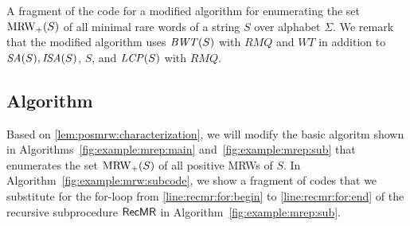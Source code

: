 \begin{algorithm}[t]
  \caption{A fragment of the code for a modified algorithm for enumerating the set $\mathrm{MRW}_+(S)$ of all minimal rare words of a string $S$ over alphabet $\Sigma$.
    We remark that the modified algorithm uses $\mathit{BWT}(S)$ with $RMQ$ and $WT$ in addition to $\mathit{SA}(S), \mathit{ISA}(S)$, $S$, and $\mathit{LCP}(S)$ with $RMQ$. 
}\label{fig:example:mrw:subcode}
\end{algorithm}

\subsection{Algorithm}
Based on \cref{lem:posmrw:characterization}, we will modify the basic algoritm shown in Algorithms~\ref{fig:example:mrep:main} and~\ref{fig:example:mrep:sub} that enumerates the set $\mathrm{MRW}_+(S)$ of all positive MRWs of $S$. In Algorithm~\ref{fig:example:mrw:subcode}, we show a fragment of codes that we substitute for the for-loop from \ref{line:recmr:for:begin} to \ref{line:recmr:for:end} of the recursive subprocedure $\textsf{RecMR}$ in Algorithm~\ref{fig:example:mrep:sub}.

